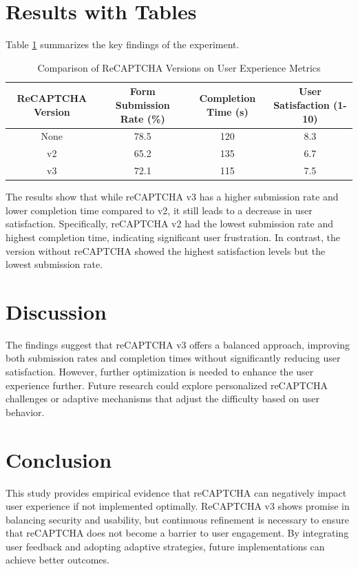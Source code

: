 \section{Results with Tables}
Table \ref{tab:results} summarizes the key findings of the experiment.

\begin{table}[ht]
\centering
\begin{tabular}{|c|c|c|c|}
\hline
ReCAPTCHA Version & Form Submission Rate (\%) & Completion Time (s) & User Satisfaction (1-10) \\
\hline
None & 78.5 & 120 & 8.3 \\
v2 & 65.2 & 135 & 6.7 \\
v3 & 72.1 & 115 & 7.5 \\
\hline
\end{tabular}
\caption{Comparison of ReCAPTCHA Versions on User Experience Metrics}
\label{tab:results}
\end{table}

The results show that while reCAPTCHA v3 has a higher submission rate and lower completion time compared to v2, it still leads to a decrease in user satisfaction. Specifically, reCAPTCHA v2 had the lowest submission rate and highest completion time, indicating significant user frustration. In contrast, the version without reCAPTCHA showed the highest satisfaction levels but the lowest submission rate.

\section{Discussion}
The findings suggest that reCAPTCHA v3 offers a balanced approach, improving both submission rates and completion times without significantly reducing user satisfaction. However, further optimization is needed to enhance the user experience further. Future research could explore personalized reCAPTCHA challenges or adaptive mechanisms that adjust the difficulty based on user behavior.

\section{Conclusion}
This study provides empirical evidence that reCAPTCHA can negatively impact user experience if not implemented optimally. ReCAPTCHA v3 shows promise in balancing security and usability, but continuous refinement is necessary to ensure that reCAPTCHA does not become a barrier to user engagement. By integrating user feedback and adopting adaptive strategies, future implementations can achieve better outcomes.

